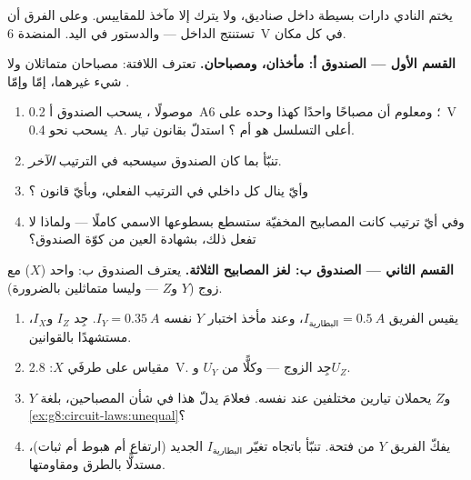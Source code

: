 \begin{problem}\label{pb:g8:circuit-laws:1}
يختم النادي دارات بسيطة داخل صناديق، ولا يترك إلا مآخذ
للمقاييس. وعلى الفرق أن تستنتج الداخل --- والدستور في اليد.
 المنضدة \qty{6}{V} في كل مكان.

\medskip\noindent\textbf{القسم الأول --- الصندوق أ: مأخذان،
ومصباحان.}
تعترف اللافتة: مصباحان متماثلان ولا شيء غيرهما، إمّا  وإمّا .
\begin{enumerate}
  \item موصولًا ، يسحب الصندوق أ \qty{0.2}{A}؛
        ومعلوم أن مصباحًا واحدًا كهذا وحده على \qty{6}{V} يسحب
        نحو \qty{0.4}{A}. أعلى التسلسل هو أم ؟
        استدلّ بقانون تيار.
  \item تنبّأ بما كان الصندوق سيسحبه في الترتيب \emph{الآخر}.
  \item وأيّ  ينال كل  داخلي في الترتيب الفعلي،
        وبأيّ قانون ؟
  \item وفي أيّ ترتيب كانت المصابيح المخفيّة ستسطع بسطوعها
        الاسمي كاملًا --- ولماذا لا تفعل ذلك، بشهادة العين من
        كوّة الصندوق؟
\end{enumerate}

\medskip\noindent\textbf{القسم الثاني --- الصندوق ب: لغز
المصابيح الثلاثة.}
يعترف الصندوق ب:  واحد ($X$)  مع زوج  ($Y$ و$Z$ --- وليسا متماثلين بالضرورة).
\begin{enumerate}[resume]
  \item يقيس الفريق $I_{\text{البطارية}} = \qty{0.5}{A}$،
        وعند مأخذ اختبار $Y$ نفسه $I_Y = \qty{0.35}{A}$. جِد
        $I_Z$ و$I_X$، مستشهدًا بالقوانين.
  \item مقياس  على طرفَي $X$: \qty{2.8}{V}. جِد  الزوج
         --- وكلًّا من $U_Y$ و$U_Z$.
  \item $Y$ و$Z$ يحملان تيارين مختلفين عند  نفسه. فعلامَ
        يدلّ هذا في شأن المصباحين، بلغة
        \cref{ex:g8:circuit-laws:unequal}؟
  \item يفكّ الفريق $Y$ من فتحة. تنبّأ باتجاه تغيّر
        $I_{\text{البطارية}}$ الجديد (ارتفاع أم هبوط أم
        ثبات)، مستدلًّا بالطرق ومقاومتها.
\end{enumerate}


\end{problem}

